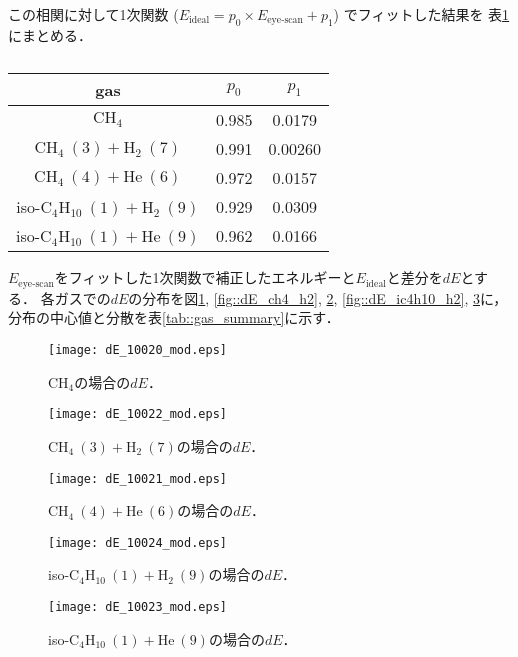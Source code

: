 \documentclass[../master]{subfiles}
\begin{document}
この相関に対して1次関数 ($E_{\text{ideal}} = p_0\times E_{\text{eye-scan}}+p_1$) でフィットした結果を
表\ref{tab::E_corr_params}にまとめる．
\begin{table}
  \centering
  \caption{}
  \label{tab::E_corr_params}
  \begin{tabular}{ccc}
    \toprule
    gas & $p_0$ & $p_1$ \\
    \midrule
    $\mathrm{CH}_{4}$ & 0.985 & 0.0179 \\
    $\mathrm{CH}_{4}\ (3) + \mathrm{H}_{2}\ (7)$ & 0.991 & 0.00260 \\
    $\mathrm{CH}_{4}\ (4) + \mathrm{He}\ (6)$ & 0.972 & 0.0157 \\
    iso-$\mathrm{C}_{4}\mathrm{H}_{10}\ (1) + \mathrm{H}_{2}\ (9)$ & 0.929 & 0.0309 \\
    iso-$\mathrm{C}_{4}\mathrm{H}_{10}\ (1) + \mathrm{He}\ (9)$ & 0.962 & 0.0166 \\
    \bottomrule
  \end{tabular}
\end{table}
$E_{\text{eye-scan}}$をフィットした1次関数で補正したエネルギーと$E_{\text{ideal}}$と差分を$dE$とする．
各ガスでの$dE$の分布を図\ref{fig::dE_ch4}, \ref{fig::dE_ch4_h2}, \ref{fig::dE_ch4_he},
\ref{fig::dE_ic4h10_h2}, \ref{fig::dE_ic4h10_he}に，分布の中心値と分散を表\ref{tab::gas_summary}に示す．
\begin{figure}
  \centering
  \begin{minipage}{0.45\columnwidth}
    \centering
    \texttt{[image: dE\_10020\_mod.eps]}
    \caption{$\mathrm{CH}_{4}$の場合の$dE$．}
    \label{fig::dE_ch4}
  \end{minipage}
\end{figure}
\begin{figure}
  \begin{minipage}{0.45\columnwidth}
    \centering
    \texttt{[image: dE\_10022\_mod.eps]}
    \caption{$\mathrm{CH}_{4}\ (3) + \mathrm{H}_{2}\ (7)$の場合の$dE$．}
    \label{fig::dE_ch4_h2}
  \end{minipage}
  \centering
  \begin{minipage}{0.45\columnwidth}
    \centering
    \texttt{[image: dE\_10021\_mod.eps]}
    \caption{$\mathrm{CH}_{4}\ (4) + \mathrm{He}\ (6)$の場合の$dE$．}
    \label{fig::dE_ch4_he}
  \end{minipage}
\end{figure}
\begin{figure}
  \begin{minipage}{0.45\columnwidth}
    \centering
    \texttt{[image: dE\_10024\_mod.eps]}
    \caption{iso-$\mathrm{C}_{4}\mathrm{H}_{10}\ (1) + \mathrm{H}_{2}\ (9)$の場合の$dE$．}
    \label{fig::dE_ic4h10_h2}
  \end{minipage}
  \centering
  \begin{minipage}{0.45\columnwidth}
    \centering
    \texttt{[image: dE\_10023\_mod.eps]}
    \caption{iso-$\mathrm{C}_{4}\mathrm{H}_{10}\ (1) + \mathrm{He}\ (9)$の場合の$dE$．}
    \label{fig::dE_ic4h10_he}
  \end{minipage}
\end{figure}
\end{document}
